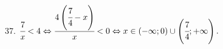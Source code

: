 37. $\cfrac{7}{x}<4\Leftrightarrow \cfrac{4\left(\cfrac{7}{4}-x\right)}{x}<0\Leftrightarrow x\in(-\infty;0)\cup\left(\cfrac{7}{4};+\infty\right).$\\
